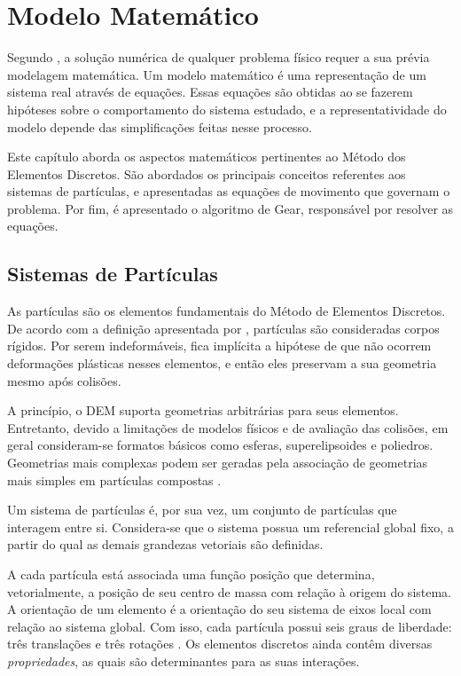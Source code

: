 \chapter{Modelo Matemático} \label{ch:mathematical_model}

Segundo , a solução numérica de qualquer problema físico requer a sua prévia modelagem matemática. Um modelo matemático é uma representação de um sistema real através de equações. Essas equações são obtidas ao se fazerem hipóteses sobre o comportamento do sistema estudado, e a representatividade do modelo depende das simplificações feitas nesse processo.

Este capítulo aborda os aspectos matemáticos pertinentes ao Método dos Elementos Discretos. São abordados os principais conceitos referentes aos sistemas de partículas, e apresentadas as equações de movimento que governam o problema. Por fim, é apresentado o algoritmo de Gear, responsável por resolver as equações.

\section{Sistemas de Partículas}

As partículas são os elementos fundamentais do Método de Elementos Discretos. De acordo com a definição apresentada por , partículas são consideradas corpos rígidos. Por serem indeformáveis, fica implícita a hipótese de que não ocorrem deformações plásticas nesses elementos, e então eles preservam a sua geometria mesmo após colisões.

A princípio, o DEM suporta geometrias arbitrárias para seus elementos. Entretanto, devido a limitações de modelos físicos e de avaliação das colisões, em geral consideram-se formatos básicos como esferas, superelipsoides e poliedros. Geometrias mais complexas podem ser geradas pela associação de geometrias mais simples em partículas compostas \cite{bib:sampaio,bib:computational_granular_dynamics}.

Um sistema de partículas é, por sua vez, um conjunto de partículas que interagem entre si. Considera-se que o sistema possua um referencial global fixo, a partir do qual as demais grandezas vetoriais são definidas.

A cada partícula está associada uma função posição que determina, vetorialmente, a posição de seu centro de massa com relação à origem do sistema. A orientação de um elemento é a orientação do seu sistema de eixos local com relação ao sistema global. Com isso, cada partícula possui seis graus de liberdade: três translações e três rotações \cite{bib:sampaio}. Os elementos discretos ainda contêm diversas \textit{propriedades}, as quais são determinantes para as suas interações.

